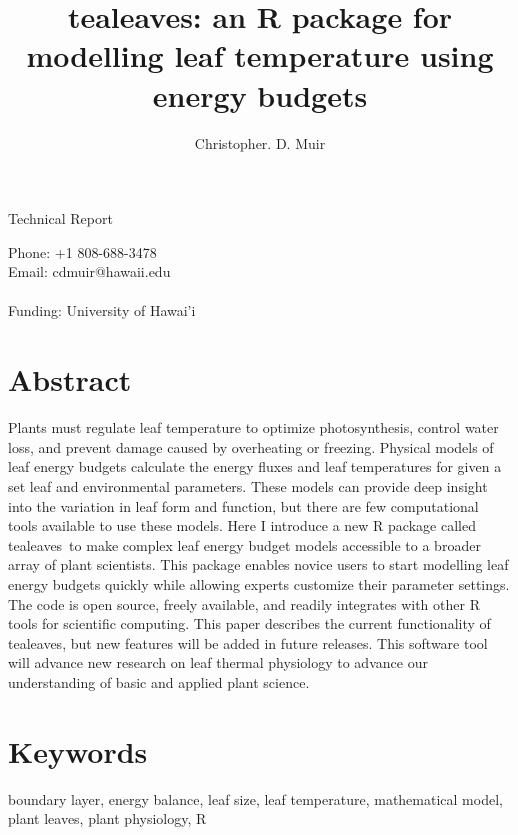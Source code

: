 \documentclass[11pt, oneside]{article}
\newcommand{\pkg}[1]{{\fontseries{b}\selectfont #1}}
\newcommand{\tealeaves}{\pkg{tealeaves}}
\begin{document}


\title{\tealeaves: an R package for modelling leaf temperature using energy budgets}
\author[1]{Christopher. D. Muir}
\date{} %

\begin{center}
Technical Report 
\end{center}

{\let\newpage\relax\maketitle}

Phone: +1 808-688-3478 \\
Email: cdmuir@hawaii.edu \\
\\
Funding: University of Hawai'i

\section*{Abstract}

Plants must regulate leaf temperature to optimize photosynthesis, control water loss, and prevent damage caused by overheating or freezing. Physical models of leaf energy budgets calculate the energy fluxes and leaf temperatures for given a set leaf and environmental parameters. These models can provide deep insight into the variation in leaf form and function, but there are few computational tools available to use these models. Here I introduce a new R package called \tealeaves~to make complex leaf energy budget models accessible to a broader array of plant scientists. This package enables novice users to start modelling leaf energy budgets quickly while allowing experts customize their parameter settings. The code is open source, freely available, and readily integrates with other R tools for scientific computing. This paper describes the current functionality of \tealeaves, but new features will be added in future releases. This software tool will advance new research on leaf thermal physiology to advance our understanding of basic and applied plant science.

\section*{Keywords}

boundary layer, energy balance, leaf size, leaf temperature, mathematical model, plant leaves, plant physiology, R
\end{document}
